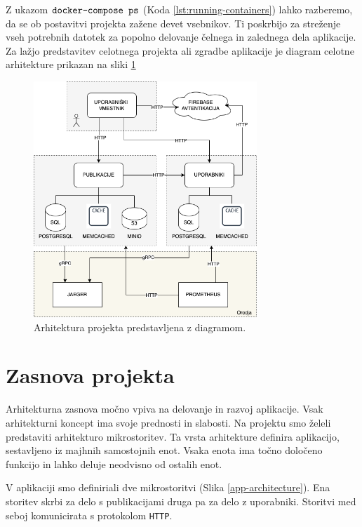 \documentclass[a4paper, 12pt]{book}
\begin{document}
Z ukazom $\verb=docker-compose ps=$ (Koda \ref{lst:running-containers}) lahko razberemo, da se ob postavitvi projekta zažene devet vsebnikov. Ti poskrbijo za streženje vseh potrebnih datotek za popolno delovanje čelnega in zalednega dela aplikacije. Za lažjo predstavitev celotnega projekta ali zgradbe aplikacije je diagram celotne arhitekture prikazan na sliki \ref{final-arch}


\begin{figure}[h]
\begin{center}
\includegraphics[width=0.75\textwidth]{slike/arch-done.png}
\end{center}
\caption{ Arhitektura projekta predstavljena z diagramom. }
\label{final-arch}
\end{figure}



\section{Zasnova projekta}
Arhitekturna zasnova močno vpiva na delovanje in razvoj aplikacije. Vsak arhitekturni koncept ima svoje prednosti in slabosti. Na projektu smo želeli predstaviti arhitekturo mikrostoritev. Ta vrsta arhitekture definira aplikacijo, sestavljeno iz majhnih samostojnih enot. Vsaka enota ima točno določeno funkcijo in lahko deluje neodvisno od ostalih enot.

V aplikaciji smo definiriali dve mikrostoritvi (Slika \ref{app-architecture}). Ena storitev skrbi za delo s publikacijami druga pa za delo z uporabniki. Storitvi med seboj komunicirata s protokolom \verb=HTTP=.
\end{document}
